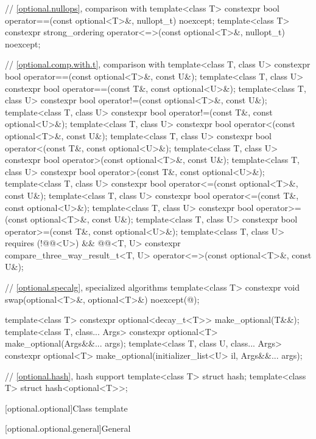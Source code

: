 \begin{codeblock}
{  // \ref{optional.nullops}, comparison with 
  template<class T> constexpr bool operator==(const optional<T>&, nullopt_t) noexcept;
  template<class T>
    constexpr strong_ordering operator<=>(const optional<T>&, nullopt_t) noexcept;

  // \ref{optional.comp.with.t}, comparison with 
  template<class T, class U> constexpr bool operator==(const optional<T>&, const U&);
  template<class T, class U> constexpr bool operator==(const T&, const optional<U>&);
  template<class T, class U> constexpr bool operator!=(const optional<T>&, const U&);
  template<class T, class U> constexpr bool operator!=(const T&, const optional<U>&);
  template<class T, class U> constexpr bool operator<(const optional<T>&, const U&);
  template<class T, class U> constexpr bool operator<(const T&, const optional<U>&);
  template<class T, class U> constexpr bool operator>(const optional<T>&, const U&);
  template<class T, class U> constexpr bool operator>(const T&, const optional<U>&);
  template<class T, class U> constexpr bool operator<=(const optional<T>&, const U&);
  template<class T, class U> constexpr bool operator<=(const T&, const optional<U>&);
  template<class T, class U> constexpr bool operator>=(const optional<T>&, const U&);
  template<class T, class U> constexpr bool operator>=(const T&, const optional<U>&);
  template<class T, class U>
      requires (!@@<U>) && @@<T, U>
    constexpr compare_three_way_result_t<T, U>
      operator<=>(const optional<T>&, const U&);

  // \ref{optional.specalg}, specialized algorithms
  template<class T>
    constexpr void swap(optional<T>&, optional<T>&) noexcept(@\seebelow@);

  template<class T>
    constexpr optional<decay_t<T>> make_optional(T&&);
  template<class T, class... Args>
    constexpr optional<T> make_optional(Args&&... args);
  template<class T, class U, class... Args>
    constexpr optional<T> make_optional(initializer_list<U> il, Args&&... args);

  // \ref{optional.hash}, hash support
  template<class T> struct hash;
  template<class T> struct hash<optional<T>>;
}
\end{codeblock}

[optional.optional]{Class template }

[optional.optional.general]{General}

